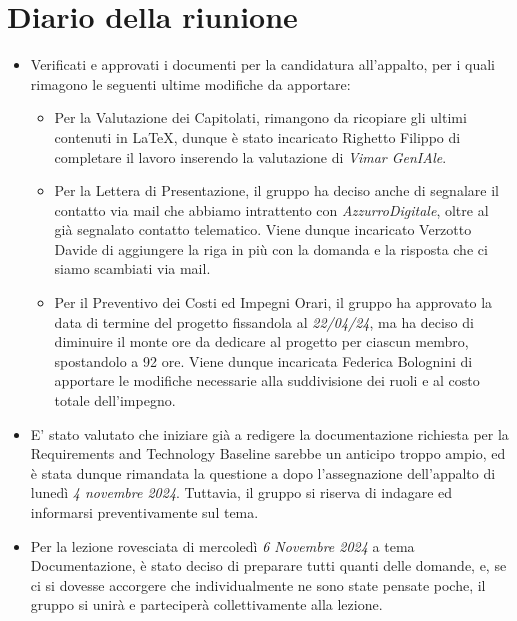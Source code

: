 \section{Diario della riunione}

\begin{itemize}
    \item Verificati e approvati i documenti per la candidatura all'appalto, per i quali rimagono le seguenti ultime modifiche da apportare:
    \begin{itemize}
      \renewcommand{\labelitemii}{--}
      \item Per la Valutazione dei Capitolati, rimangono da ricopiare gli ultimi contenuti in LaTeX, dunque è stato
            incaricato Righetto Filippo di completare il lavoro inserendo la valutazione di \emph{Vimar GenIAle}.
      \item Per la Lettera di Presentazione, il gruppo ha deciso anche di segnalare il contatto via mail che abbiamo intrattento con \emph{AzzurroDigitale}, 
            oltre al già segnalato contatto telematico. Viene dunque incaricato Verzotto Davide di aggiungere la riga in più con la domanda e la risposta
            che ci siamo scambiati via mail.
      \item Per il Preventivo dei Costi ed Impegni Orari, il gruppo ha approvato la data di termine del progetto fissandola al \emph{22/04/24}, 
            ma ha deciso di diminuire il monte ore da dedicare al progetto per ciascun membro, spostandolo a 92 ore. Viene dunque incaricata Federica 
            Bolognini di apportare le modifiche necessarie alla suddivisione dei ruoli e al costo totale dell'impegno.
    \end{itemize}
    \item E' stato valutato che iniziare già a redigere la documentazione richiesta per la Requirements and Technology Baseline sarebbe un anticipo troppo
          ampio, ed è stata dunque rimandata la questione a dopo l'assegnazione dell'appalto di lunedì \emph{4 novembre 2024}. Tuttavia, il gruppo si riserva
          di indagare ed informarsi preventivamente sul tema.
    \item Per la lezione rovesciata di mercoledì \emph{6 Novembre 2024} a tema Documentazione, è stato deciso di preparare tutti quanti delle domande, e, 
          se ci si dovesse accorgere che individualmente ne sono state pensate poche, il gruppo si unirà e parteciperà collettivamente alla lezione.
\end{itemize}



